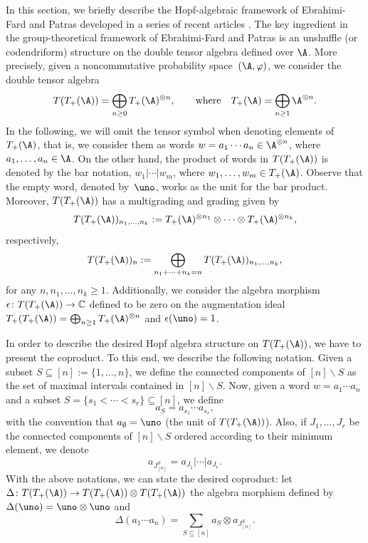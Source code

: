 In this section, we briefly describe the Hopf-algebraic framework of Ebrahimi-Fard and Patras developed in a series of recent articles \cite{EFP1, EFP2, EFP3, EFP4, EFP5}. The key ingredient in the group-theoretical framework of Ebrahimi-Fard and Patras is an unshuffle (or codendriform) structure on the double tensor algebra defined over $\A$. More precisely, given a noncommutative probability space~$(\A,\varphi)$, we consider the double tensor algebra
\[
	T(T_+(\A)) = \bigoplus_{n\geq0} T_+(\A)^{\otimes n},
	\qquad\text{where}\quad
	T_+(\A) = \bigoplus_{n\geq1} \A^{\otimes n}.
\]
In the following, we will omit the tensor symbol when denoting elements of $T_+(\A)$, that is, we consider them as words $w = a_1\cdots a_n \in \A^{\otimes n}$, where $a_1,\dots,a_n\in \A$. On the other hand, the product of words in $T(T_+(\A))$ is denoted by the bar notation, $w_1|\cdots |w_m$, where $w_1,\dots,w_m \allowbreak\in T_+(\A)$. Observe that the empty word, denoted by~$\uno$, works as the unit for the bar product. Moreover, $T(T_+(\A))$ has a multigrading and grading given by
\[
	T(T_+(\A))_{n_1,\dots,n_k}
	:= T_+(\A)^{\otimes n_1} \otimes \cdots \otimes T_+(\A)^{\otimes n_k},
\]
respectively,
\[
	T(T_+(\A))_n :=
	\bigoplus_{n_1+\cdots + n_k = n} T(T_+(\A))_{n_1,\dots,n_k},
\]
for any $n,n_1,\dots,n_k\geq1$. Additionally, we consider the algebra morphism $\epsilon\colon T(T_+(\A))\to\mathbb{C}$ defined to be zero on the augmentation ideal $T_+(T_+(\A)) = \bigoplus_{n\geq 1} T_+(\A)^{\otimes n}$ and $\epsilon(\uno) = 1$.

In order to describe the desired Hopf algebra structure on $T(T_+(\A))$, we have to present the coproduct. To this end,
 we describe the following notation. Given a subset $S\subseteq [n] :=\{1,\dots, n\}$, we define the connected components of $[n]\backslash S$ as the set of maximal intervals contained in $[n]\backslash S$. Now, given a word $w= a_1\cdots a_n$ and a subset $S = \{s_1 <\cdots < s_r\} \subseteq [n]$, we define
\[
	a_S = a_{s_1}\cdots a_{s_r},
\]
with the convention that $a_\emptyset = \uno$ (the unit of $T(T_+(\A))$). Also, if $J_1,\dots,J_r$ be the connected components of $[n] \backslash S$ ordered according to their minimum element, we denote
\[
	a_{J_{[n]}^S} = a_{J_1} | \cdots | a_{J_r}.
\]
With the above notations, we can state the desired coproduct: let $\Delta\colon T(T_+(\A))\to T(T_+(\A))\otimes T(T_+(\A))$ the algebra morphism defined by $\Delta(\uno) = \uno\otimes \uno$ and
\begin{equation}
\label{eq:copEFP}
	\Delta(a_1\cdots a_n)= \sum_{S\subseteq [n]} a_S \otimes a_{J_{[n]}^S}.
\end{equation}


